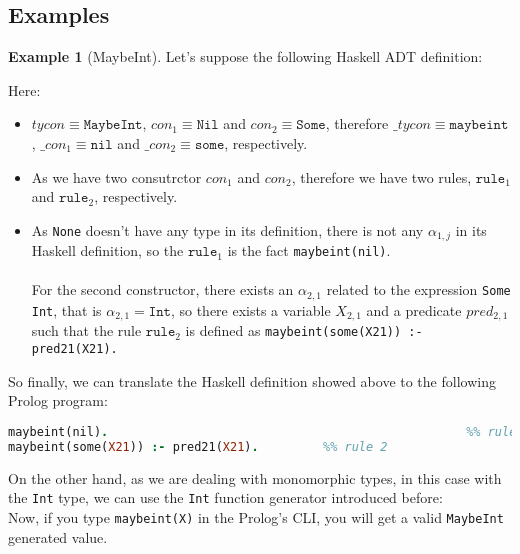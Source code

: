 \documentclass{report}
\theoremstyle{definition}
\newtheorem{example}{Example}[section]
\theoremstyle{definition}
\newcommand{\ttt}[1]{\texttt{#1}}
\begin{document}
\subsection{Examples} \label{ch:monomorphic-types-examples}
\begin{example}[MaybeInt]
	Let's suppose the following Haskell ADT definition:
	
	Here:
	\begin{itemize}
		\item $tycon \equiv \ttt{MaybeInt}$, $con_1 \equiv \ttt{Nil}$ and $con_2 \equiv \ttt{Some}$, therefore $\_tycon \equiv \ttt{maybeint}$, $\_con_1 \equiv \ttt{nil}$ and $\_con_2 \equiv \ttt{some}$, respectively.
		\item As we have two consutrctor $con_1$ and $con_2$, therefore we have two rules, $\ttt{rule}_1$ and $\ttt{rule}_2$, respectively.
		\item As \ttt{None} doesn't have any type in its definition, there is not any $\alpha_{1,j}$ in its Haskell definition, so the $\ttt{rule}_1$ is the fact \ttt{maybeint(nil)}.\\\\
		      For the second constructor, there exists an $\alpha_{2,1}$ related to the expression \ttt{Some Int}, that is $\alpha_{2,1} = \ttt{Int}$, so there exists a variable $X_{2,1}$ and a predicate $pred_{2,1}$ such that the rule $\ttt{rule}_2$ is defined as \ttt{maybeint(some(X21)) :- pred21(X21).}
	\end{itemize}
	So finally, we can translate the Haskell definition showed above to the following Prolog program:\\
	\begin{lstlisting}[language=Prolog]
maybeint(nil).													%% rule 1
maybeint(some(X21)) :- pred21(X21).			%% rule 2
	\end{lstlisting}
	On the other hand, as we are dealing with monomorphic types, in this case with the \ttt{Int} type, we can use the \ttt{Int} function generator introduced before:\\
	
	Now, if you type \ttt{maybeint(X)} in the Prolog's CLI, you will get a valid \ttt{MaybeInt} generated value.\\
\end{example}
\end{document}
